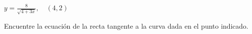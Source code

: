 \item $\displaystyle y = \frac{8}{\sqrt{4 + 3x}}, \quad (4, 2)$
\par
Encuentre la ecuación de la recta tangente a la curva dada en el punto indicado.

